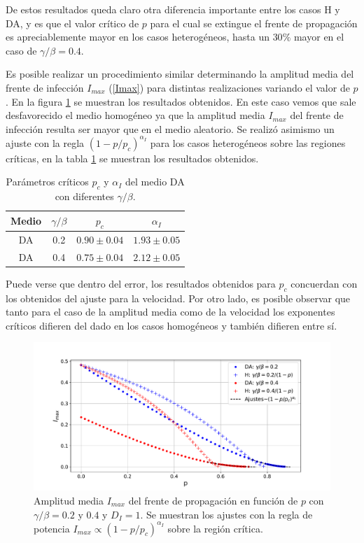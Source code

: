 De estos resultados queda claro otra diferencia importante entre los casos H y DA, y es que el valor crítico de $p$ para el cual se extingue el frente 
de propagación es apreciablemente mayor en los casos heterogéneos, hasta un $30\%$ mayor en el caso de $\gamma/\beta=0.4$. 

Es posible realizar un procedimiento similar determinando la amplitud media del frente de infección $I_{max}$ (\ref{Imax}) para distintas realizaciones variando el 
valor de $p$. En la figura \ref{fig:amplitud_p} se muestran los resultados obtenidos. En este caso vemos que sale desfavorecido el medio homogéneo ya que 
la amplitud media $I_{max}$ del frente de infección resulta ser mayor que en el medio aleatorio.
Se realizó asimismo un ajuste con la regla $(1-p/p_c)^{\alpha_I}$ para los casos heterogéneos sobre las regiones críticas, en la tabla \ref{tab:param_criticos_I} 
se muestran los resultados obtenidos.

\begin{table}[h]
    \centering
    \caption{Parámetros críticos $p_c$ y $\alpha_I$ del medio DA con diferentes $\gamma/\beta$.}
    \label{tab:param_criticos_I}
    \begin{tabular}{@{}cccc@{}}
    \toprule
    Medio & $\gamma/\beta$ & $p_c$         & $\alpha_I$    \\ \midrule
    DA    & 0.2            & $0.90\pm 0.04$ & $1.93 \pm 0.05$ \\
    DA    & 0.4            & $0.75\pm 0.04$ & $2.12 \pm 0.05$ \\ \bottomrule
    \end{tabular}
\end{table}

Puede verse que dentro del error, los resultados obtenidos para $p_c$ concuerdan con los obtenidos del ajuste para la velocidad. Por otro lado, es posible observar que 
tanto para el caso de la amplitud media como de la velocidad los exponentes críticos difieren del dado en los casos homogéneos y también difieren entre sí.


 \begin{figure}[H]
    \centering
    \includegraphics[width=\imsizeL]{amplitud_p.pdf}
    \caption{Amplitud media $I_{max}$ del frente de propagación en función de $p$ con $\gamma/\beta=0.2$ y $0.4$ y $D_{I}=1$. Se muestran los 
    ajustes con la regla de potencia $I_{max}\propto(1-p/p_c)^{\alpha_I}$ sobre la región crítica.}
    \label{fig:amplitud_p}
 \end{figure}
 
